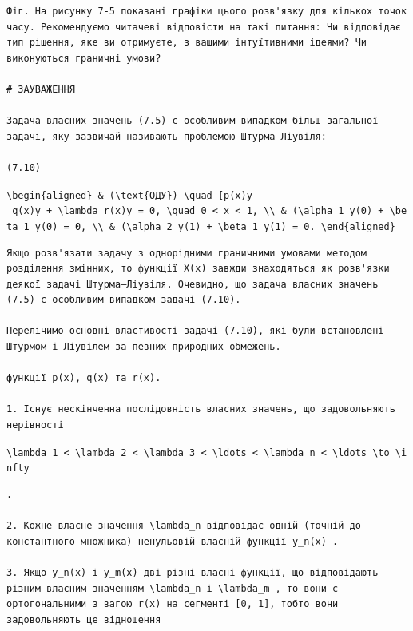 \documentclass[
  ukrainian,
]{article}
\begin{document}
\begin{verbatim}
Фіг. На рисунку 7-5 показані графіки цього розв'язку для кількох точок часу. Рекомендуємо читачеві відповісти на такі питання: Чи відповідає тип рішення, яке ви отримуєте, з вашими інтуїтивними ідеями? Чи виконуються граничні умови?

# ЗАУВАЖЕННЯ

Задача власних значень (7.5) є особливим випадком більш загальної задачі, яку зазвичай називають проблемою Штурма-Ліувіля:

(7.10)
\end{verbatim}

\texttt{\textbackslash{}begin\{aligned\}\ \&\ (\textbackslash{}text\{ОДУ\})\ \textbackslash{}quad\ {[}p(x)y\textquotesingle{}{]}\textquotesingle{}\ -\ q(x)y\ +\ \textbackslash{}lambda\ r(x)y\ =\ 0,\ \textbackslash{}quad\ 0\ \textless{}\ x\ \textless{}\ 1,\ \textbackslash{}\textbackslash{}\ \&\ (\textbackslash{}alpha\_1\ y(0)\ +\ \textbackslash{}beta\_1\ y\textquotesingle{}(0)\ =\ 0,\ \textbackslash{}\textbackslash{}\ \&\ (\textbackslash{}alpha\_2\ y(1)\ +\ \textbackslash{}beta\_1\ y\textquotesingle{}(1)\ =\ 0.\ \textbackslash{}end\{aligned\}}

\begin{verbatim}
Якщо розв'язати задачу з однорідними граничними умовами методом розділення змінних, то функції X(x) завжди знаходяться як розв'язки деякої задачі Штурма–Ліувіля. Очевидно, що задача власних значень (7.5) є особливим випадком задачі (7.10).

Перелічимо основні властивості задачі (7.10), які були встановлені Штурмом і Ліувілем за певних природних обмежень.

функції p(x), q(x) та r(x).

1. Існує нескінченна послідовність власних значень, що задовольняють нерівності
\end{verbatim}

\texttt{\textbackslash{}lambda\_1\ \textless{}\ \textbackslash{}lambda\_2\ \textless{}\ \textbackslash{}lambda\_3\ \textless{}\ \textbackslash{}ldots\ \textless{}\ \textbackslash{}lambda\_n\ \textless{}\ \textbackslash{}ldots\ \textbackslash{}to\ \textbackslash{}infty}

\begin{verbatim}
.

2. Кожне власне значення \lambda_n відповідає одній (точній до константного множника) ненульовій власній функції y_n(x) .

3. Якщо y_n(x) і y_m(x) дві різні власні функції, що відповідають різним власним значенням \lambda_n і \lambda_m , то вони є ортогональними з вагою r(x) на сегменті [0, 1], тобто вони задовольняють це відношення
\end{verbatim}
\end{document}
